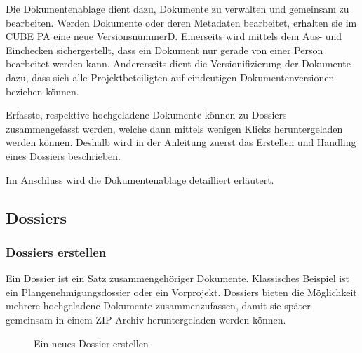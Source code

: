 Die Dokumentenablage dient dazu, Dokumente zu verwalten und gemeinsam zu bearbeiten. Werden Dokumente oder deren Metadaten bearbeitet, erhalten sie im CUBE PA eine neue VersionsnummerD. Einerseits wird mittels dem Aus- und Einchecken sichergestellt, dass ein Dokument nur gerade von einer Person bearbeitet werden kann. Andererseits dient die Versionifizierung der Dokumente dazu, dass sich alle Projektbeteiligten auf eindeutigen Dokumentenversionen beziehen können. 

\vspace{1cm}  

Erfasste, respektive hochgeladene Dokumente können zu Dossiers zusammengefasst werden, welche dann mittels wenigen Klicks heruntergeladen werden können. Deshalb wird in der Anleitung zuerst das Erstellen und Handling eines Dossiers beschrieben.

\vspace{\baselineskip}

Im Anschluss wird die Dokumentenablage detailliert erläutert.

\subsection{Dossiers}
\label{bkm:Ref442544219}\subsubsection{Dossiers erstellen}

Ein Dossier ist ein Satz zusammengehöriger Dokumente. Klassisches Beispiel ist ein Plangenehmigungsdossier oder ein Vorprojekt. Dossiers bieten die Möglichkeit mehrere hochgeladene Dokumente zusammenzufassen, damit sie später gemeinsam in einem ZIP-Archiv heruntergeladen werden können.

\begin{figure}[H]
\caption{Ein neues Dossier erstellen}
\end{figure}

